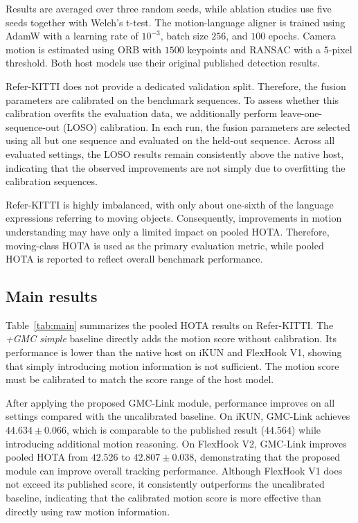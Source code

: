 \documentclass[sigconf,anonymous,nonacm]{acmart}
\begin{document}
Results are averaged over three random seeds, while ablation studies use five seeds together with Welch's t-test. The motion-language aligner is trained using AdamW with a learning rate of $10^{-3}$, batch size $256$, and $100$ epochs. Camera motion is estimated using ORB with $1500$ keypoints and RANSAC with a $5$-pixel threshold. Both host models use their original published detection results.

Refer-KITTI does not provide a dedicated validation split. Therefore, the fusion parameters are calibrated on the benchmark sequences. To assess whether this calibration overfits the evaluation data, we additionally perform leave-one-sequence-out (LOSO) calibration. In each run, the fusion parameters are selected using all but one sequence and evaluated on the held-out sequence. Across all evaluated settings, the LOSO results remain consistently above the native host, indicating that the observed improvements are not simply due to overfitting the calibration sequences.

Refer-KITTI is highly imbalanced, with only about one-sixth of the language expressions referring to moving objects. Consequently, improvements in motion understanding may have only a limited impact on pooled HOTA. Therefore, moving-class HOTA is used as the primary evaluation metric, while pooled HOTA is reported to reflect overall benchmark performance.

\subsection{Main results}
\label{sec:main}

Table~\ref{tab:main} summarizes the pooled HOTA results on Refer-KITTI. The \emph{+GMC simple} baseline directly adds the motion score without calibration. Its performance is lower than the native host on iKUN and FlexHook V1, showing that simply introducing motion information is not sufficient. The motion score must be calibrated to match the score range of the host model.

After applying the proposed GMC-Link module, performance improves on all settings compared with the uncalibrated baseline. On iKUN, GMC-Link achieves $44.634 \pm 0.066$, which is comparable to the published result ($44.564$) while introducing additional motion reasoning. On FlexHook V2, GMC-Link improves pooled HOTA from $42.526$ to $42.807 \pm 0.038$, demonstrating that the proposed module can improve overall tracking performance. Although FlexHook V1 does not exceed its published score, it consistently outperforms the uncalibrated baseline, indicating that the calibrated motion score is more effective than directly using raw motion information.
\end{document}
